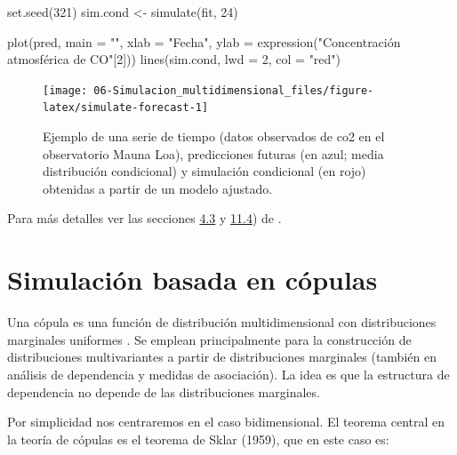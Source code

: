 \documentclass[
  10pt,
]{book}
\newenvironment{Shaded}{\begin{snugshade}}{\end{snugshade}}
\newcommand{\AttributeTok}[1]{\textcolor[rgb]{0.77,0.63,0.00}{#1}}
\newcommand{\DecValTok}[1]{\textcolor[rgb]{0.00,0.00,0.81}{#1}}
\newcommand{\FunctionTok}[1]{\textcolor[rgb]{0.00,0.00,0.00}{#1}}
\newcommand{\NormalTok}[1]{#1}
\newcommand{\OtherTok}[1]{\textcolor[rgb]{0.56,0.35,0.01}{#1}}
\newcommand{\StringTok}[1]{\textcolor[rgb]{0.31,0.60,0.02}{#1}}
\theoremstyle{break}
\theoremstyle{nonumberplain}
\begin{document}
\begin{Shaded}
\begin{Highlighting}[]
\FunctionTok{set.seed}\NormalTok{(}\DecValTok{321}\NormalTok{)}
\NormalTok{sim.cond }\OtherTok{\textless{}{-}} \FunctionTok{simulate}\NormalTok{(fit, }\DecValTok{24}\NormalTok{)}

\FunctionTok{plot}\NormalTok{(pred, }\AttributeTok{main =} \StringTok{""}\NormalTok{, }\AttributeTok{xlab =} \StringTok{"Fecha"}\NormalTok{, }
     \AttributeTok{ylab =} \FunctionTok{expression}\NormalTok{(}\StringTok{"Concentración atmosférica de CO"}\NormalTok{[}\DecValTok{2}\NormalTok{]))}
\FunctionTok{lines}\NormalTok{(sim.cond, }\AttributeTok{lwd =} \DecValTok{2}\NormalTok{, }\AttributeTok{col =} \StringTok{"red"}\NormalTok{)}
\end{Highlighting}
\end{Shaded}

\begin{figure}[!htbp]

{\centering \texttt{[image: 06-Simulacion\_multidimensional\_files/figure-latex/simulate-forecast-1]} 

}

\caption{Ejemplo de una serie de tiempo (datos observados de co2 en el observatorio Mauna Loa), predicciones futuras (en azul; media distribución condicional) y simulación condicional (en rojo) obtenidas a partir de un modelo ajustado.}\label{fig:simulate-forecast}
\end{figure}

Para más detalles ver las secciones \href{https://otexts.com/fpp2/prediction-intervals.html}{4.3} y \href{https://otexts.com/fpp2/bootstrap.html}{11.4}) de \citet{hyndman2018}.

\hypertarget{simulaciuxf3n-basada-en-cuxf3pulas}{%
\section{Simulación basada en cópulas}\label{simulaciuxf3n-basada-en-cuxf3pulas}}

Una cópula es una función de distribución multidimensional con distribuciones marginales uniformes \citep[e.g.][]{nelsen2006, hofert2018}.
Se emplean principalmente para la construcción de distribuciones multivariantes a partir de distribuciones marginales (también en análisis de dependencia y medidas de asociación).
La idea es que la estructura de dependencia no depende de las distribuciones marginales.

Por simplicidad nos centraremos en el caso bidimensional.
El teorema central en la teoría de cópulas es el teorema de Sklar (1959), que en este caso es:
\end{document}
